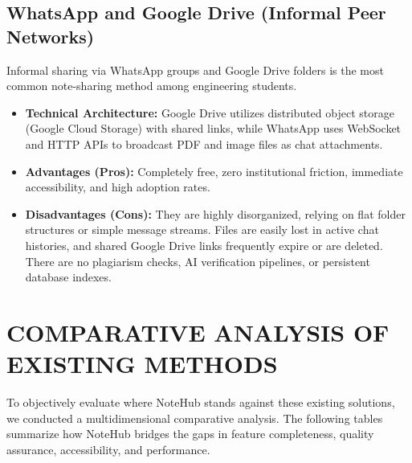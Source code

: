 \documentclass[12,Times new Roman,a4paper]{report}
\begin{document}
\subsection{WhatsApp and Google Drive (Informal Peer Networks)}
Informal sharing via WhatsApp groups and Google Drive folders is the most common note-sharing method among engineering students.
\begin{itemize}
    \item \textbf{Technical Architecture:} Google Drive utilizes distributed object storage (Google Cloud Storage) with shared links, while WhatsApp uses WebSocket and HTTP APIs to broadcast PDF and image files as chat attachments.
    \item \textbf{Advantages (Pros):} Completely free, zero institutional friction, immediate accessibility, and high adoption rates.
    \item \textbf{Disadvantages (Cons):} They are highly disorganized, relying on flat folder structures or simple message streams. Files are easily lost in active chat histories, and shared Google Drive links frequently expire or are deleted. There are no plagiarism checks, AI verification pipelines, or persistent database indexes.
\end{itemize}

\section{COMPARATIVE ANALYSIS OF EXISTING METHODS}

To objectively evaluate where NoteHub stands against these existing solutions, we conducted a multidimensional comparative analysis. The following tables summarize how NoteHub bridges the gaps in feature completeness, quality assurance, accessibility, and performance.
\end{document}
